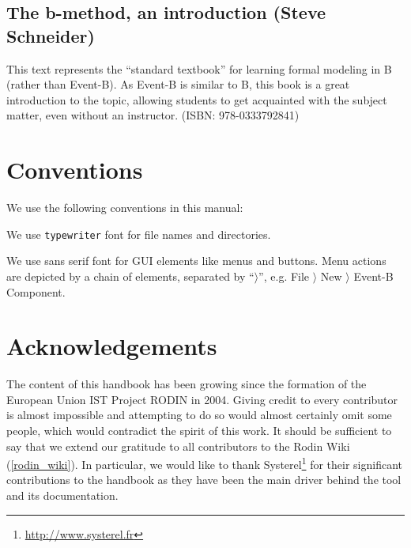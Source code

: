 \documentclass[12pt]{book}
\begin{document}
\subsection{The b-method, an introduction (Steve Schneider)}
\label{schneider_book}

This text represents the ``standard textbook'' for learning formal modeling in B (rather than Event-B).  As Event-B is similar to B, this book is a great introduction to the topic, allowing students to get acquainted with the subject matter, even without an instructor. (ISBN: 978-0333792841)

\section{Conventions}
\label{conventions}

We use the following conventions in this manual:


We use \texttt{typewriter} font for file names and directories.

We use \textsf{sans serif font} for GUI elements like menus and buttons.  Menu actions are depicted by a chain of elements, separated by ``$\rangle$'', e.g. \textsf{File $\rangle$ New $\rangle$ Event-B Component}.

\section{Acknowledgements}
\label{sec:acknowledgements}

The content of this handbook has been growing since the formation of the European Union IST Project RODIN in 2004.  Giving credit to every contributor is almost impossible and attempting to do so would almost certainly omit some people, which would contradict the spirit of this work.  It should be sufficient to say that we extend our gratitude to all contributors to the Rodin Wiki (\ref{rodin_wiki}). In particular, we would like to thank Systerel\footnote{\url{http://www.systerel.fr}} for their significant contributions to the handbook as they have been the main driver behind the tool and its documentation.
\end{document}
